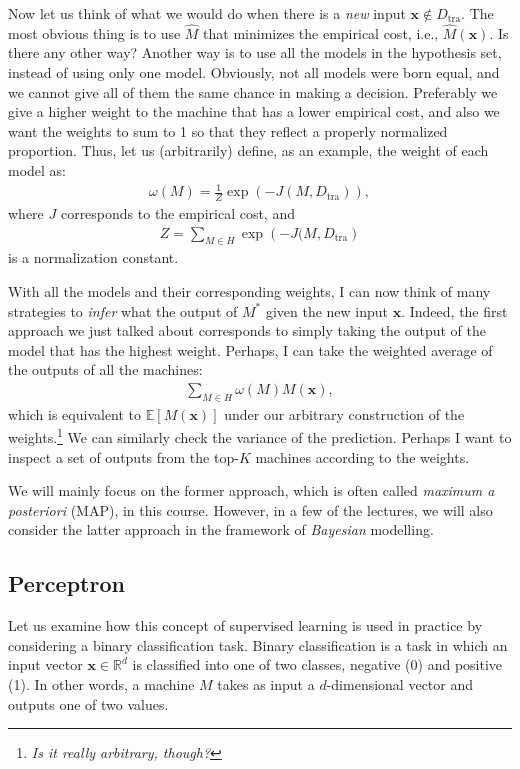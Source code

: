 \documentclass{report}
\newcommand{\vect}[1]{\mathbf{#1}}
\newcommand{\vx}[0]{\vect{x}}
\begin{document}
Now let us think of what we would do when there is a {\it new} input $\vx \notin
D_{\text{tra}}$. The most obvious thing is to use $\hat{M}$ that minimizes the
empirical cost, i.e., $\hat{M}(\vx)$. Is there any other way? Another way is to
use all the models in the hypothesis set, instead of using only one model.
Obviously, not all models were born equal, and we cannot give all of them the
same chance in making a decision. Preferably we give a higher weight to the
machine that has a lower empirical cost, and also we want the weights to sum to
1 so that they reflect a properly normalized proportion. Thus, let us
(arbitrarily) define, as an example, the weight of each model as:
\begin{align*}
    \omega(M) = \frac{1}{Z} \exp\left( -J(M, D_{\text{tra}} ) \right),
\end{align*}
where $J$ corresponds to the empirical cost, and 
\begin{align*}
    Z = \sum_{M \in H} \exp\left( -J(M, D_{\text{tra}} \right)
\end{align*}
is a normalization constant. 

With all the models and their corresponding weights, I can now think of many
strategies to {\it infer} what the output of $M^*$ given the new input $\vx$.
Indeed, the first approach we just talked about corresponds to simply taking the
output of the model that has the highest weight. Perhaps, I can take the
weighted average of the outputs of all the machines:
\begin{align*}
    \sum_{M \in H} \omega(M) M(\vx),
\end{align*}
which is equivalent to $\mathbb{E}\left[ M(\vx) \right]$ under our arbitrary
construction of the weights.\footnote{
    {\it Is it really arbitrary, though?}
} We can similarly check the variance of the prediction. Perhaps I want to
inspect a set of outputs from the top-$K$ machines according to the weights.

We will mainly focus on the former approach, which is often called {\it maximum
a posteriori} (MAP), in this course. However, in a few of the lectures, we will
also consider the latter approach in the framework of {\it Bayesian} modelling.


\subsection{Perceptron}

Let us examine how this concept of supervised learning is used in practice by
considering a binary classification task. Binary classification is a task in
which an input vector $\vx \in \mathbb{R}^d$ is classified into one of two
classes, negative (0) and positive (1). In other words, a machine $M$ takes as
input a $d$-dimensional vector and outputs one of two values. 
\end{document}
